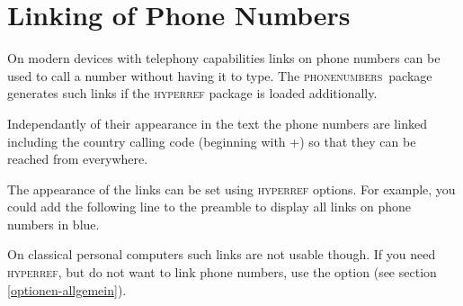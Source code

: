 \documentclass[numbers=noenddot]{scrreprt}
\newcommand*{\Paket}[1]{\textsc{#1}}
\newcommand{\phone}{\textcolor{cnltx}{\Paket{phone\-numbers}}}
\newcommand*{\sieheAbschnitt}[1]{(see section \ref{#1})}
\begin{document}
\section{Linking of Phone Numbers} \label{verlinkung}
On modern devices with telephony capabilities links on phone numbers can be used to call a number without having it to type. The \phone\ package generates such links if the \Paket{hyperref} package
\cite{hyperref}
is loaded additionally.

Independantly of their appearance in the text the phone numbers are linked including the country calling code (beginning with +) so that they can be reached from everywhere.

The appearance of the links can be set using \Paket{hyperref} options. For example, you could add the following line to the preamble to display all links on phone numbers in blue.

\begin{sourcecode}
  \usepackage[colorlinks=true,urlcolor=blue]{hyperref}
\end{sourcecode}

On classical personal computers such links are not usable though. If you need \Paket{hyperref}, but do not want to link phone numbers, use the  option
\sieheAbschnitt{optionen-allgemein}.
\end{document}
